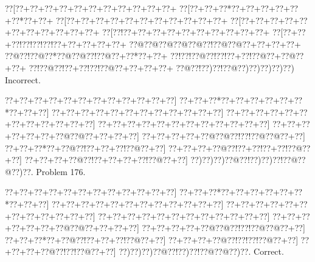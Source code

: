 \documentclass[a5paper]{article}
\begin{document}
\begin{center}
{\goo
\0??[\0??+\0??+\0??+\0??+\0??+\0??+\0??+\0??+\0??+\0??+\0??+
\0??[\0??+\0??+\0??*\0??+\0??+\0??+\0??+\0??+\0??*\0??+\0??+
\0??[\0??+\0??+\0??+\0??+\0??+\0??+\0??+\0??+\0??+\0??+\0??+
\0??[\0??+\0??+\0??+\0??+\0??+\0??+\0??+\0??+\0??+\0??+\0??+
\0??[\0??!\0??+\0??+\0??+\0??+\0??+\0??+\0??+\0??+\0??+\0??+
\0??[\0??+\0??+\0??!\0??!\0??!\0??!\0??+\0??+\0??+\0??+\0??+
\0??@\0??@\0??@\0??@\0??@\0??!\0??@\0??@\0??+\0??+\0??+\0??+
\0??@\0??!\0??@\0??*\0??@\0??@\0??!\0??@\0??+\0??*\0??+\0??+
\0??!\0??!\0??@\0??!\0??!\0??+\0??!\0??@\0??+\0??@\0??+\0??+
\0??!\0??@\0??!\0??+\0??!\0??!\0??@\0??+\0??+\0??+\0??+
\0??@\0??!\0??)\0??!\0??@\0??)\0??)\0??)\0??)\0??)
}
Incorrect. 

\end{center}
\newpage
\begin{center}
{\goo
\0??+\0??+\0??+\0??+\0??+\0??+\0??+\0??+\0??+\0??+\0??+\0??]
\0??+\0??+\0??*\0??+\0??+\0??+\0??+\0??+\0??*\0??+\0??+\0??]
\0??+\0??+\0??+\0??+\0??+\0??+\0??+\0??+\0??+\0??+\0??+\0??]
\0??+\0??+\0??+\0??+\0??+\0??+\0??+\0??+\0??+\0??+\0??+\0??]
\0??+\0??+\0??+\0??+\0??+\0??+\0??+\0??+\0??+\0??+\0??+\0??]
\0??+\0??+\0??+\0??+\0??+\0??+\0??@\0??@\0??+\0??+\0??+\0??]
\0??+\0??+\0??+\0??+\0??@\0??@\0??!\0??!\0??@\0??@\0??+\0??]
\0??+\0??+\0??*\0??+\0??@\0??!\0??+\0??+\0??!\0??@\0??+\0??]
\0??+\0??+\0??+\0??@\0??!\0??+\0??!\0??+\0??!\0??@\0??+\0??]
\0??+\0??+\0??+\0??@\0??!\0??+\0??+\0??+\0??!\0??@\0??+\0??]
\0??)\0??)\0??)\0??@\0??!\0??)\0??)\0??!\0??@\0??@\0??)\0??.
}
Problem 176.

\end{center}
\begin{center}
{\goo
\0??+\0??+\0??+\0??+\0??+\0??+\0??+\0??+\0??+\0??+\0??+\0??]
\0??+\0??+\0??*\0??+\0??+\0??+\0??+\0??+\0??*\0??+\0??+\0??]
\0??+\0??+\0??+\0??+\0??+\0??+\0??+\0??+\0??+\0??+\0??+\0??]
\0??+\0??+\0??+\0??+\0??+\0??+\0??+\0??+\0??+\0??+\0??+\0??]
\0??+\0??+\0??+\0??+\0??+\0??+\0??+\0??+\0??+\0??+\0??+\0??]
\0??+\0??+\0??+\0??+\0??+\0??+\0??@\0??@\0??+\0??+\0??+\0??]
\0??+\0??+\0??+\0??+\0??@\0??@\0??!\0??!\0??@\0??@\0??+\0??]
\0??+\0??+\0??*\0??+\0??@\0??!\0??+\0??+\0??!\0??@\0??+\0??]
\0??+\0??+\0??+\0??@\0??!\0??!\0??!\0??@\0??+\0??]
\0??+\0??+\0??+\0??@\0??!\0??!\0??@\0??+\0??]
\0??)\0??)\0??)\0??@\0??!\0??)\0??!\0??@\0??@\0??)\0??.
}
Correct. 

\end{center}
\end{document}
